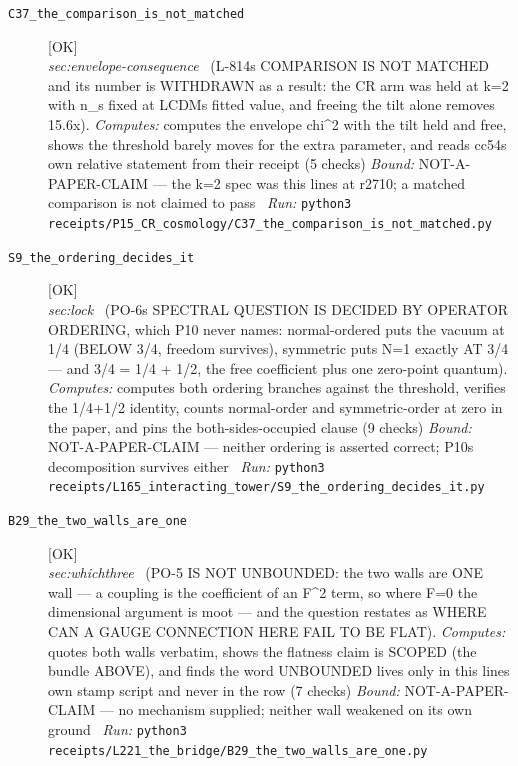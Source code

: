 \begin{description}
\item[\label{rcpt:C37_the_comparison_is_not_matched}\texttt{C37\_the\_comparison\_is\_not\_matched}]\hfill\textsf{[OK]}\\
\textit{sec:envelope-consequence} \ (L-814s COMPARISON IS NOT MATCHED and its number is WITHDRAWN as a result: the CR arm was held at k=2 with n\_s fixed at LCDMs fitted value, and freeing the tilt alone removes 15.6x). 
\emph{Computes:} computes the envelope chi\textasciicircum{}2 with the tilt held and free, shows the threshold barely moves for the extra parameter, and reads cc54s own relative statement from their receipt (5 checks)
 \emph{Bound:} NOT-A-PAPER-CLAIM --- the k=2 spec was this lines at r2710; a matched comparison is not claimed to pass
\ \emph{Run:} \texttt{python3 receipts/P15\_CR\_cosmology/C37\_the\_comparison\_is\_not\_matched.py}
\item[\label{rcpt:S9_the_ordering_decides_it}\texttt{S9\_the\_ordering\_decides\_it}]\hfill\textsf{[OK]}\\
\textit{sec:lock} \ (PO-6s SPECTRAL QUESTION IS DECIDED BY OPERATOR ORDERING, which P10 never names: normal-ordered puts the vacuum at 1/4 (BELOW 3/4, freedom survives), symmetric puts N=1 exactly AT 3/4 --- and 3/4 = 1/4 + 1/2, the free coefficient plus one zero-point quantum). 
\emph{Computes:} computes both ordering branches against the threshold, verifies the 1/4+1/2 identity, counts normal-order and symmetric-order at zero in the paper, and pins the both-sides-occupied clause (9 checks)
 \emph{Bound:} NOT-A-PAPER-CLAIM --- neither ordering is asserted correct; P10s decomposition survives either
\ \emph{Run:} \texttt{python3 receipts/L165\_interacting\_tower/S9\_the\_ordering\_decides\_it.py}
\item[\label{rcpt:B29_the_two_walls_are_one}\texttt{B29\_the\_two\_walls\_are\_one}]\hfill\textsf{[OK]}\\
\textit{sec:whichthree} \ (PO-5 IS NOT UNBOUNDED: the two walls are ONE wall --- a coupling is the coefficient of an F\textasciicircum{}2 term, so where F=0 the dimensional argument is moot --- and the question restates as WHERE CAN A GAUGE CONNECTION HERE FAIL TO BE FLAT). 
\emph{Computes:} quotes both walls verbatim, shows the flatness claim is SCOPED (the bundle ABOVE), and finds the word UNBOUNDED lives only in this lines own stamp script and never in the row (7 checks)
 \emph{Bound:} NOT-A-PAPER-CLAIM --- no mechanism supplied; neither wall weakened on its own ground
\ \emph{Run:} \texttt{python3 receipts/L221\_the\_bridge/B29\_the\_two\_walls\_are\_one.py}

\end{description}
